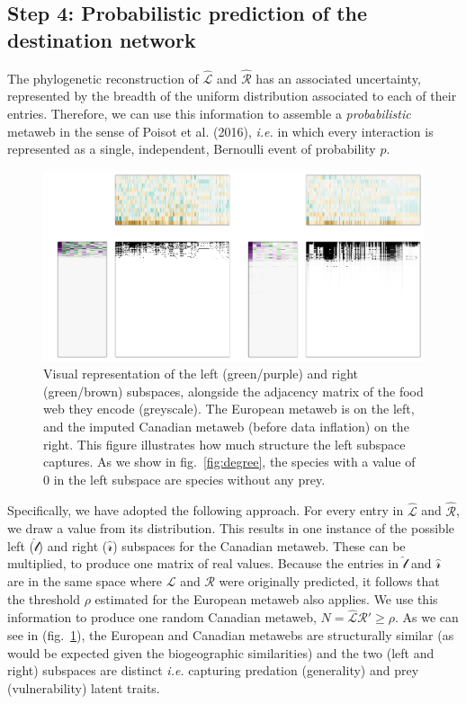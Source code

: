 \documentclass[11pt]{article}
\makeatletter
\def\maxwidth{\ifdim\Gin@nat@width>\linewidth\linewidth
\else\Gin@nat@width\fi}
\let\Oldincludegraphics\includegraphics
\renewcommand{\includegraphics}[1]{\Oldincludegraphics[width=\maxwidth]{#1}}
\makeatother
\begin{document}
\hypertarget{step-4-probabilistic-prediction-of-the-destination-network}{%
\subsection{Step 4: Probabilistic prediction of the destination
network}\label{step-4-probabilistic-prediction-of-the-destination-network}}

The phylogenetic reconstruction of \(\hat{\mathscr{L}}\) and
\(\hat{\mathscr{R}}\) has an associated uncertainty, represented by the
breadth of the uniform distribution associated to each of their entries.
Therefore, we can use this information to assemble a
\emph{probabilistic} metaweb in the sense of Poisot et al. (2016),
\emph{i.e.} in which every interaction is represented as a single,
independent, Bernoulli event of probability \(p\).

\begin{figure}
\hypertarget{fig:subspaces}{%
\centering
\includegraphics{figures/figure-subspaces.png}
\caption{Visual representation of the left (green/purple) and right
(green/brown) subspaces, alongside the adjacency matrix of the food web
they encode (greyscale). The European metaweb is on the left, and the
imputed Canadian metaweb (before data inflation) on the right. This
figure illustrates how much structure the left subspace captures. As we
show in fig.~\ref{fig:degree}, the species with a value of 0 in the left
subspace are species without any prey.}\label{fig:subspaces}
}
\end{figure}

Specifically, we have adopted the following approach. For every entry in
\(\hat{\mathscr{L}}\) and \(\hat{\mathscr{R}}\), we draw a value from
its distribution. This results in one instance of the possible left
(\(\hat{\mathscr{l}}\)) and right (\(\hat{\mathscr{r}}\)) subspaces for
the Canadian metaweb. These can be multiplied, to produce one matrix of
real values. Because the entries in \(\hat{\mathscr{l}}\) and
\(\hat{\mathscr{r}}\) are in the same space where \(\mathscr{L}\) and
\(\mathscr{R}\) were originally predicted, it follows that the threshold
\(\rho\) estimated for the European metaweb also applies. We use this
information to produce one random Canadian metaweb,
\(N = \hat{\mathscr{L}}\hat{\mathscr{R}}' \ge \rho\). As we can see in
(fig.~\ref{fig:subspaces}), the European and Canadian metawebs are
structurally similar (as would be expected given the biogeographic
similarities) and the two (left and right) subspaces are distinct
\emph{i.e.} capturing predation (generality) and prey (vulnerability)
latent traits.
\end{document}

